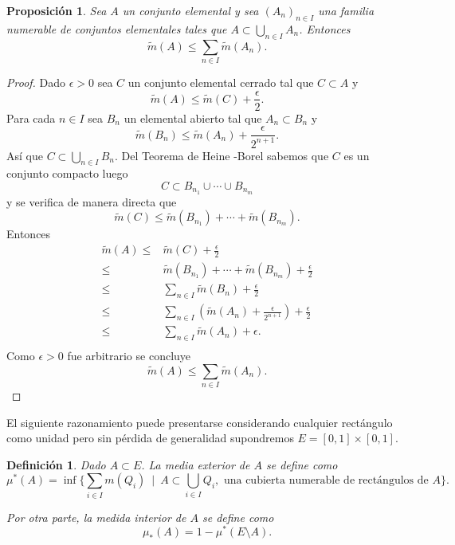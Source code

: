 \documentclass[twoside,12pt,a4 paper,openright]{book}
\newtheorem{pro}[claim]{Proposici\'on}
\newtheorem{defi}[claim]{Definici\'on}
\begin{document}
      \begin{pro}\label{pro1} Sea $A$ un conjunto elemental y sea $(A_n)_{n\in I}
       $  una familia numerable de conjuntos elementales tales  que $A\subset \bigcup_{n\in I} A_n $. Entonces $$ \tilde{m}(A) \leq \sum_{n\in I} \tilde{m}(A_n) .$$
           \end{pro}
\begin{proof}
Dado  $\epsilon>0$ sea $C$ un conjunto elemental cerrado tal que $C\subset A$ y 
$$\tilde{m}(A) \leq \tilde{m} (C ) + \frac{\epsilon}{2}  . $$ 
Para cada $n\in I$ sea $B_n$ un elemental abierto tal que $A_n \subset B_n$ y 
$$ \tilde{m} (B_n) \leq \tilde{m} (A_n) + \frac{ \epsilon}{ 2^{n+1}}.  $$
As\'i que $\displaystyle C\subset \bigcup_{n\in I} B_n   $.  
Del Teorema de  Heine -Borel sabemos que  $C$ es un conjunto  compacto luego 
    $$ C \subset B_{n_1} \cup\cdots \cup B_{n_m} $$
    y  se verifica de manera directa que 
    $$  \tilde{m} (C ) \leq  \tilde{m}( B_{n_1}) +\cdots +  \tilde{m} (B_{n_m})   .$$
Entonces 
\begin{align*}
 \tilde{m}(A) \leq &  \tilde{m} (C ) + \frac{\epsilon}{2} \\
 \leq &  \tilde{m}( B_{n_1}) +\cdots +  \tilde{m} (B_{n_m})  + \frac{\epsilon}{2} \\
  \leq &  \sum_{n\in I}   \tilde{m}( B_{n})  +  \frac{\epsilon}{2} \\
 \leq &\sum_{n\in I} \left( \tilde{m} (A_n) + \frac{ \epsilon}{ 2^{n+1}} \right)   
 +  \frac{\epsilon}{2} \\
 \leq &\sum_{n\in I}   \tilde{m} (A_n)    
 +  \epsilon . \\
\end{align*}
Como $\epsilon>0$ fue arbitrario se concluye 
$$\tilde{m}(A) \leq  \sum_{n\in I}   \tilde{m} (A_n)    
 . $$ 
\end{proof} 



El siguiente razonamiento puede presentarse considerando  cualquier rect\'angulo como unidad pero sin p\'erdida de generalidad supondremos $E=[0,1]\times [0,1]$.


\begin{defi}
Dado $A\subset E$. La media exterior de $A$ se define como 
$$ \mu^* (A ) = \inf\{   \sum_{i\in I} m(Q_i)  \ \mid \  A\subset \bigcup_{i\in I} Q_i , \textrm{ una cubierta numerable de rect\'angulos de } A   \}.$$

Por otra parte, la medida interior de $A$ se define como 
$$ \mu_* (A )= 1-  \mu^* (E\setminus A ).$$

\end{defi}
\end{document}
